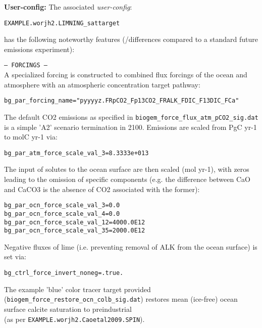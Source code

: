 \documentclass[10pt,twoside]{article}
\begin{document}
\noindent \textbf{User-config:} The associated \textit{user-config}:
\vspace{-10pt}\begin{verbatim}EXAMPLE.worjh2.LIMNING_sattarget\end{verbatim}\vspace{-10pt}
has the following noteworthy features (/differences compared to a standard future emissions experiment):
\begin{compactitem}
                \item \texttt{--- FORCINGS ---}
                \\ A specialized forcing is constructed to combined flux forcings of the ocean and atmosphere with an atmospheric concentration target pathway:
\vspace{-5pt}\begin{verbatim}
bg_par_forcing_name="pyyyyz.FRpCO2_Fp13CO2_FRALK_FDIC_F13DIC_FCa"
                \end{verbatim}\vspace{-5pt}
The default CO2 emissions as specified in \texttt{biogem\_force\_flux\_atm\_pCO2\_sig.dat} is a simple 'A2' scenario termination in 2100. Emissions are scaled from PgC yr-1 to molC yr-1 via:
\vspace{-5pt}\begin{verbatim}
bg_par_atm_force_scale_val_3=8.3333e+013
                \end{verbatim}\vspace{-5pt}
                The input of solutes to the ocean surface are then scaled (mol yr-1), with zeros leading to the omission of specific components (e.g. the difference between CaO and CaCO3 is the absence of CO2 associated with the former):
\vspace{-5pt}\begin{verbatim}
bg_par_ocn_force_scale_val_3=0.0
bg_par_ocn_force_scale_val_4=0.0
bg_par_ocn_force_scale_val_12=4000.0E12
bg_par_ocn_force_scale_val_35=2000.0E12
                \end{verbatim}\vspace{-5pt}
Negative fluxes of lime (i.e. preventing removal of ALK from the ocean surface) is set via:
\vspace{-5pt}\begin{verbatim}
bg_ctrl_force_invert_noneg=.true.
                \end{verbatim}\vspace{-5pt}
                The example 'blue' color tracer target provided (\texttt{biogem\_force\_restore\_ocn\_colb\_sig.dat}) restores mean (ice-free) ocean surface calcite saturation to preindustrial
                \\(as per \texttt{EXAMPLE.worjh2.Caoetal2009.SPIN}).
        \end{compactitem}
        
\end{document}
